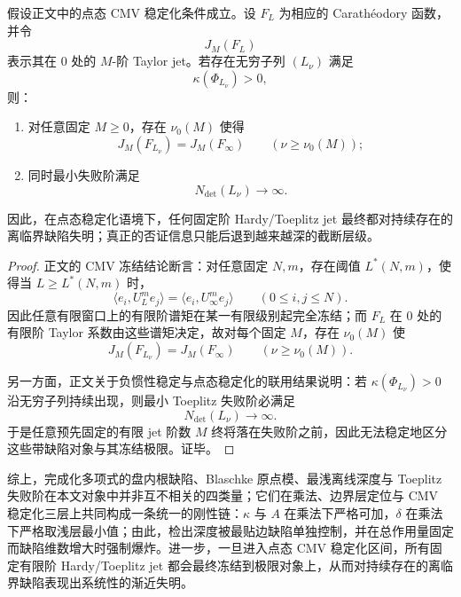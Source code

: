 \begin{theorem}\label{thm:conclusion-cmv-stabilization-finite-jet-blindness}
假设正文中的点态 CMV 稳定化条件成立。设 \(F_L\) 为相应的 Carath\'eodory 函数，并令
\[
J_M(F_L)
\]
表示其在 \(0\) 处的 \(M\)-阶 Taylor jet。若存在无穷子列 \((L_\nu)\) 满足
\[
\kappa(\Phi_{L_\nu})>0,
\]
则：
\begin{enumerate}
  \item 对任意固定 \(M\ge 0\)，存在 \(\nu_0(M)\) 使得
  \[
  J_M(F_{L_\nu})=J_M(F_\infty)
  \qquad (\nu\ge \nu_0(M));
  \]
  \item 同时最小失败阶满足
  \[
  N_{\det}(L_\nu)\to\infty.
  \]
\end{enumerate}
因此，在点态稳定化语境下，任何固定阶 Hardy/Toeplitz jet 最终都对持续存在的离临界缺陷失明；真正的否证信息只能后退到越来越深的截断层级。
\end{theorem}
\begin{proof}
正文的 CMV 冻结结论断言：对任意固定 \(N,m\)，存在阈值 \(L^\ast(N,m)\)，使得当 \(L\ge L^\ast(N,m)\) 时，
\[
\langle e_i,U_L^m e_j\rangle
=
\langle e_i,U_\infty^m e_j\rangle
\qquad (0\le i,j\le N).
\]
因此任意有限窗口上的有限阶谱矩在某一有限级别起完全冻结；而 \(F_L\) 在 \(0\) 处的有限阶 Taylor 系数由这些谱矩决定，故对每个固定 \(M\)，存在 \(\nu_0(M)\) 使
\[
J_M(F_{L_\nu})=J_M(F_\infty)
\qquad (\nu\ge \nu_0(M)).
\]

另一方面，正文关于负惯性稳定与点态稳定化的联用结果说明：若 \(\kappa(\Phi_{L_\nu})>0\) 沿无穷子列持续出现，则最小 Toeplitz 失败阶必满足
\[
N_{\det}(L_\nu)\to\infty.
\]
于是任意预先固定的有限 jet 阶数 \(M\) 终将落在失败阶之前，因此无法稳定地区分这些带缺陷对象与其冻结极限。证毕。
\end{proof}

\noindent
综上，完成化多项式的盘内根缺陷、Blaschke 原点模、最浅离线深度与 Toeplitz 失败阶在本文对象中并非互不相关的四类量；它们在乘法、边界层定位与 CMV 稳定化三层上共同构成一条统一的刚性链：\(\kappa\) 与 \(A\) 在乘法下严格可加，\(\delta\) 在乘法下严格取浅层最小值；由此，检出深度被最贴边缺陷单独控制，并在总作用量固定而缺陷维数增大时强制爆炸。进一步，一旦进入点态 CMV 稳定化区间，所有固定有限阶 Hardy/Toeplitz jet 都会最终冻结到极限对象上，从而对持续存在的离临界缺陷表现出系统性的渐近失明。

\endinput
